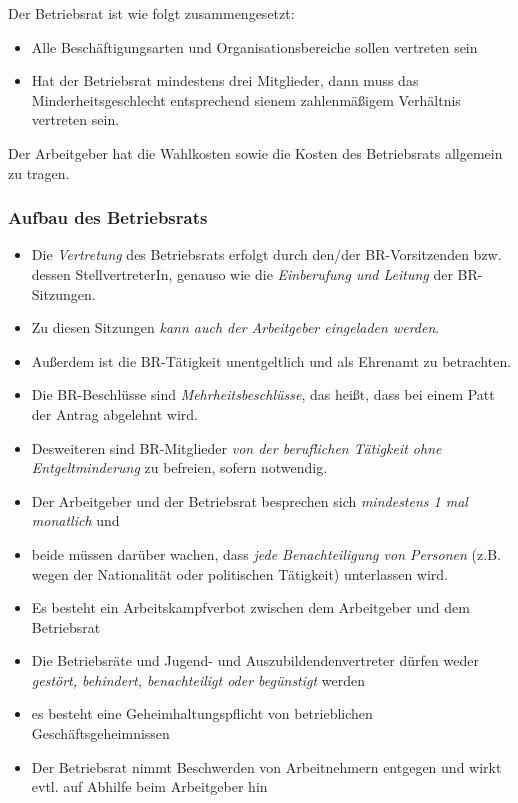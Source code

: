 \documentclass[a4paper, 12pt]{report}
\begin{document}
Der Betriebsrat ist wie folgt zusammengesetzt: 

\begin{itemize}
    \item Alle Beschäftigungsarten und Organisationsbereiche sollen vertreten 
        sein
    \item Hat der Betriebsrat mindestens drei Mitglieder, dann muss das 
        Minderheitsgeschlecht entsprechend sienem zahlenmäßigem Verhältnis 
        vertreten sein. 
\end{itemize}

Der Arbeitgeber hat die Wahlkosten sowie die Kosten des Betriebsrats allgemein
zu tragen. \\

\subsubsection{Aufbau des Betriebsrats}

\begin{itemize}
    \item Die \emph{Vertretung} des Betriebsrats erfolgt durch den/der 
        BR-Vorsitzenden bzw. dessen StellvertreterIn, genauso wie die 
        \emph{Einberufung und Leitung} der BR-Sitzungen. 
    \item Zu diesen Sitzungen \emph{kann auch der Arbeitgeber eingeladen 
        werden}. 
    \item Außerdem ist die BR-Tätigkeit unentgeltlich und als Ehrenamt zu 
        betrachten. 
    \item Die BR-Beschlüsse sind \emph{Mehrheitsbeschlüsse}, das heißt, 
        dass bei einem Patt der Antrag abgelehnt wird. 
    \item Desweiteren sind BR-Mitglieder \emph{von der beruflichen Tätigkeit 
        ohne Entgeltminderung} zu befreien, sofern notwendig. 
    \item Der Arbeitgeber und der Betriebsrat besprechen sich \emph{mindestens 
        1 mal monatlich} und 
    \item beide müssen darüber wachen, dass \emph{jede Benachteiligung von 
        Personen} (z.B. wegen der Nationalität oder politischen Tätigkeit) 
        unterlassen wird. 
    \item Es besteht ein Arbeitskampfverbot zwischen dem Arbeitgeber und dem 
        Betriebsrat
    \item Die Betriebsräte und Jugend- und Auszubildendenvertreter dürfen weder 
        \emph{gestört, behindert, benachteiligt oder begünstigt} werden
    \item es besteht eine Geheimhaltungspflicht von betrieblichen 
        Geschäftsgeheimnissen
    \item Der Betriebsrat nimmt Beschwerden von Arbeitnehmern entgegen und wirkt
        evtl. auf Abhilfe beim Arbeitgeber hin
\end{itemize}
\end{document}
